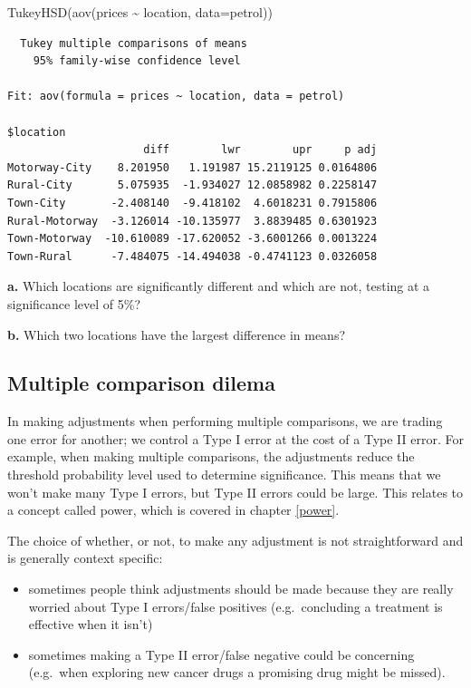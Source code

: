 \documentclass[
  oneside]{krantz}
\newenvironment{Shaded}{\begin{snugshade}}{\end{snugshade}}
\newcommand{\AttributeTok}[1]{\textcolor[rgb]{0.77,0.63,0.00}{#1}}
\newcommand{\FunctionTok}[1]{\textcolor[rgb]{0.00,0.00,0.00}{#1}}
\newcommand{\NormalTok}[1]{#1}
\newcommand{\SpecialCharTok}[1]{\textcolor[rgb]{0.00,0.00,0.00}{#1}}
\providecommand{\tightlist}{%
  \setlength{\itemsep}{0pt}\setlength{\parskip}{0pt}}
\begin{document}
\begin{Shaded}
\begin{Highlighting}[]
\FunctionTok{TukeyHSD}\NormalTok{(}\FunctionTok{aov}\NormalTok{(prices }\SpecialCharTok{\textasciitilde{}}\NormalTok{ location, }\AttributeTok{data=}\NormalTok{petrol))}
\end{Highlighting}
\end{Shaded}

\begin{verbatim}
  Tukey multiple comparisons of means
    95% family-wise confidence level

Fit: aov(formula = prices ~ location, data = petrol)

$location
                     diff        lwr        upr     p adj
Motorway-City    8.201950   1.191987 15.2119125 0.0164806
Rural-City       5.075935  -1.934027 12.0858982 0.2258147
Town-City       -2.408140  -9.418102  4.6018231 0.7915806
Rural-Motorway  -3.126014 -10.135977  3.8839485 0.6301923
Town-Motorway  -10.610089 -17.620052 -3.6001266 0.0013224
Town-Rural      -7.484075 -14.494038 -0.4741123 0.0326058
\end{verbatim}

\textbf{a.} Which locations are significantly different and which are not, testing at a significance level of 5\%?

\textbf{b.} Which two locations have the largest difference in means?

\hypertarget{multiple-comparison-dilema}{%
\subsection{Multiple comparison dilema}\label{multiple-comparison-dilema}}

In making adjustments when performing multiple comparisons, we are trading one error for another; we control a Type I error at the cost of a Type II error. For example, when making multiple comparisons, the adjustments reduce the threshold probability level used to determine significance. This means that we won't make many Type I errors, but Type II errors could be large. This relates to a concept called power, which is covered in chapter \ref{power}.

The choice of whether, or not, to make any adjustment is not straightforward and is generally context specific:

\begin{itemize}
\tightlist
\item
  sometimes people think adjustments should be made because they are really worried about Type I errors/false positives (e.g.~concluding a treatment is effective when it isn't)
\item
  sometimes making a Type II error/false negative could be concerning (e.g.~when exploring new cancer drugs a promising drug might be missed).
\end{itemize}
\end{document}
